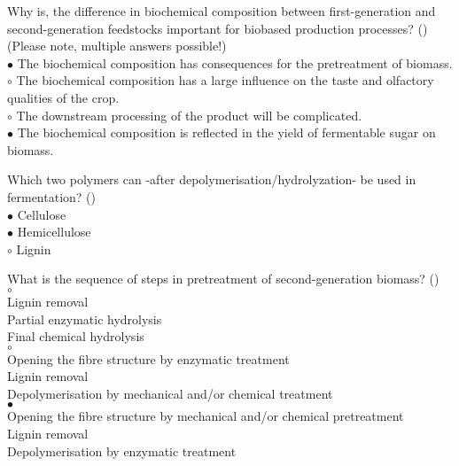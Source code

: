 \documentclass[]{beamer}
\begin{document}
\begin{CJK}{UTF8}{gbsn}
\begin{frame}[shrink] {} 
\addtocounter{answers}{1}
\color{blue}
Why is, the difference in biochemical composition between first-generation and second-generation feedstocks important for biobased production processes?
 ({})\\
(Please note, multiple answers possible!)
  \\
\color{black}
\setlength{\parindent}{-0.4cm}
{\color{red}$\bullet$} The biochemical composition has consequences for the pretreatment  of biomass.  \\
{\color{red}$\circ$} The biochemical composition has a large influence on the taste and olfactory qualities of the crop.  \\
{\color{red}$\circ$} The downstream processing of the product will be complicated.  \\
{\color{red}$\bullet$} The biochemical composition is reflected in the yield of fermentable sugar on biomass.  \\
\end{frame}


\begin{frame}[shrink] {} 
\addtocounter{answers}{1}
\color{blue}
  Which two polymers can -after depolymerisation/hydrolyzation- be used in fermentation? 
 ({})\\
\color{black}
\setlength{\parindent}{-0.4cm}
{\color{red}$\bullet$} Cellulose  \\
{\color{red}$\bullet$} Hemicellulose  \\
{\color{red}$\circ$} Lignin  \\
\end{frame}


\begin{frame}[shrink] {} 
\addtocounter{answers}{1}
\color{blue}
  What is the sequence of steps in pretreatment of second-generation biomass? 
 ({})\\
\color{black}
\setlength{\parindent}{-0.4cm}
{\color{red}$\circ$}    \\
Lignin removal\\
Partial enzymatic hydrolysis\\
Final chemical hydrolysis\\
{\color{red}$\circ$}    \\
Opening the fibre structure by enzymatic treatment \\
Lignin removal\\
Depolymerisation by mechanical and/or chemical treatment\\
{\color{red}$\bullet$}   \\
Opening the fibre structure by mechanical and/or chemical pretreatment\\
Lignin removal\\
Depolymerisation by enzymatic treatment\\
\end{frame}


\end{CJK}
\end{document}

